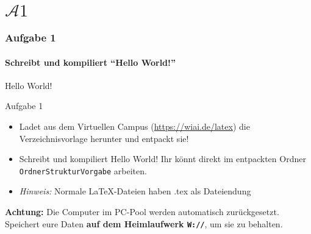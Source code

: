 \section{$\mathcal{A}1$}
\begin{frame}
\frametitle{Aufgabe 1}
\framesubtitle{Schreibt und kompiliert ``Hello World!''}
\begin{center}
\begin{rm}
\Large Hello World!\\
\end{rm}
\end{center}
\bigskip
\begin{block}{Aufgabe 1}
\begin{itemize}
\item Ladet aus dem Virtuellen Campus (\url{https://wiai.de/latex}) die Verzeichnisvorlage herunter und entpackt sie!
\item Schreibt und kompiliert \glqq{}Hello World\grqq! Ihr könnt direkt im entpackten Ordner \texttt{OrdnerStrukturVorgabe} arbeiten.
\item \textit{Hinweis:} Normale \LaTeX -Dateien haben {\ttfamily .tex} als Dateiendung
\end{itemize}
\end{block}
\begin{alertblock}{\textbf{Achtung:}}
Die Computer im PC-Pool werden automatisch zurückgesetzt. Speichert eure Daten \textbf{auf dem Heimlaufwerk \texttt{W://}}, um sie zu behalten.
\end{alertblock}
\end{frame}